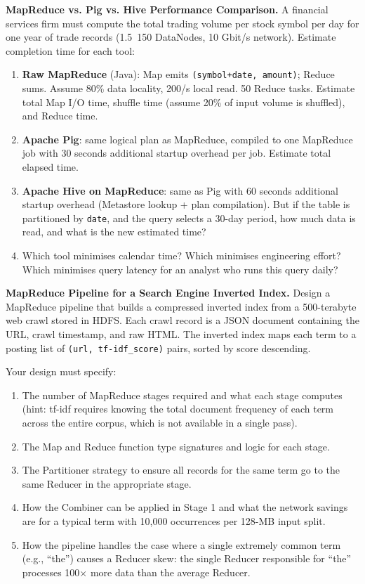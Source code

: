 \ap \textbf{MapReduce vs. Pig vs. Hive Performance Comparison.}
A financial services firm must compute the total trading volume per
stock symbol per day for one year of trade records (1.5\TB\, 150
DataNodes, 10 Gbit/s network). Estimate completion time for each tool:

\begin{enumerate}[label=(\alph*)]
  \item \textbf{Raw MapReduce} (Java): Map emits \texttt{(symbol+date, amount)};
        Reduce sums. Assume 80\% data locality, 200\MB/s local read.
        50 Reduce tasks. Estimate total Map I/O time, shuffle time
        (assume 20\% of input volume is shuffled), and Reduce time.
  \item \textbf{Apache Pig}: same logical plan as MapReduce, compiled
        to one MapReduce job with 30 seconds additional startup overhead
        per job. Estimate total elapsed time.
  \item \textbf{Apache Hive on MapReduce}: same as Pig with 60 seconds
        additional startup overhead (Metastore lookup + plan compilation).
        But if the table is partitioned by \texttt{date}, and the query
        selects a 30-day period, how much data is read, and what is the
        new estimated time?
  \item Which tool minimises calendar time? Which minimises engineering
        effort? Which minimises query latency for an analyst who runs
        this query daily?
\end{enumerate}

\bigskip
{}

\dpr \textbf{MapReduce Pipeline for a Search Engine Inverted Index.}
Design a MapReduce pipeline that builds a compressed inverted index
from a 500-terabyte web crawl stored in HDFS. Each crawl record is
a JSON document containing the URL, crawl timestamp, and raw HTML.
The inverted index maps each term to a posting list of
\texttt{(url, tf-idf\_score)} pairs, sorted by score descending.

Your design must specify:
\begin{enumerate}[label=(\alph*)]
  \item The number of MapReduce stages required and what each stage
        computes (hint: tf-idf requires knowing the total document
        frequency of each term across the entire corpus, which is not
        available in a single pass).
  \item The Map and Reduce function type signatures and logic for
        each stage.
  \item The Partitioner strategy to ensure all records for the same
        term go to the same Reducer in the appropriate stage.
  \item How the Combiner can be applied in Stage 1 and what the
        network savings are for a typical term with 10,000 occurrences
        per 128-MB input split.
  \item How the pipeline handles the case where a single extremely
        common term (e.g., ``the'') causes a Reducer skew: the single
        Reducer responsible for ``the'' processes 100$\times$ more data
        than the average Reducer.
\end{enumerate}

